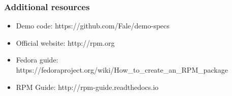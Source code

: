 \documentclass[t,aspectratio=169]{beamer}
\begin{document}
\begin{frame}
    \frametitle{Additional resources}
    \begin{itemize}
        \item Demo code: https://github.com/Fale/demo-specs
        \item Official website: http://rpm.org
        \item Fedora guide: https://fedoraproject.org/wiki/How\_to\_create\_an\_RPM\_package
        \item RPM Guide: http://rpm-guide.readthedocs.io
    \end{itemize}
\end{frame}

\end{document}
